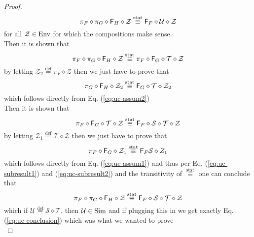 \begin{itemize}
\begin{proof}
    \begin{equation}  
      \pi_F \diamond \pi_G \diamond \mathsf{F}_H \diamond \mathcal Z \stackrel{\text{stat}}{\equiv} \mathsf{F}_F \diamond \mathcal U \diamond \mathcal Z \label{eq:uc-conclusion}
    \end{equation}
    for all $\mathcal Z \in \text{Env}$ for which the compositions make sense. \bigskip \\
    Then it is shown that
    \begin{equation}
      \pi_F \diamond \pi_G \diamond \mathsf{F}_H \diamond \mathcal Z \stackrel{\text{stat}}{\equiv} \pi_F \diamond \mathsf{F}_G \diamond \mathcal T \diamond \mathcal Z \label{eq:uc-subresult1}
    \end{equation}
    by letting $\mathcal Z_2 \stackrel{\text{def}}{=} \pi_F \diamond \mathcal Z$ then we just have to prove that
    \begin{equation}
      \pi_G \diamond \mathsf{F}_H \diamond \mathcal Z_2 \stackrel{\text{stat}}{\equiv} \mathsf{F}_G \diamond \mathcal T \diamond \mathcal Z_2 
    \end{equation}
    which follows directly from Eq. (\ref{eq:uc-assum2}) \smallskip \\
    Then it is shown that
    \begin{equation}
      \pi_F \diamond \mathsf{F}_G \diamond \mathcal T \diamond \mathcal Z \stackrel{\text{stat}}{\equiv} \mathsf{F}_F \diamond \mathcal S \diamond \mathcal T \diamond \mathcal Z \label{eq:uc-subresult2}
    \end{equation}
    by letting $\mathcal Z_1 \stackrel{\text{def}}{=} \mathcal T \diamond \mathcal Z$ then we just have to prove that
    \begin{equation}
      \pi_F \diamond \mathsf{F}_G \diamond \mathcal Z_1 \stackrel{\text{stat}}{\equiv} \mathsf{F}_F \mathcal S \diamond Z_1
    \end{equation}
    which follows directly from Eq. (\ref{eq:uc-assum1}) and thus per Eq. (\ref{eq:uc-subresult1}) and (\ref{eq:uc-subresult2}) and the transitivity of $\stackrel{\text{stat}}{\equiv}$ one can conclude that
    \begin{equation}  
      \pi_F \diamond \pi_G \diamond \mathsf{F}_H \diamond \mathcal Z \stackrel{\text{stat}}{\equiv} \mathsf{F}_F \diamond \mathcal S \diamond \mathcal T \diamond \mathcal Z
    \end{equation}
    which if $\mathcal U \stackrel{\text{def}}{=} \mathcal S \diamond \mathcal T$, then $\mathcal U \in \text{Sim}$ and if plugging this in we get exactly Eq. (\ref{eq:uc-conclusion}) which was what we wanted to prove
 \smallskip \\

  \end{proof}
\end{itemize}


\newpage

